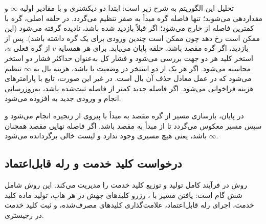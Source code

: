 تحلیل این الگوریتم به شرح زیر است: ابتدا دو دیکشنری  و  با مقادیر اولیه $\infty$ و  مقداردهی می‌شوند؛ تنها فاصله گره مبدأ به صفر تنظیم می‌گردد. در حلقه اصلی، گره با کمترین فاصله از  خارج می‌شود؛ اگر قبلاً بازدید شده باشد، نادیده گرفته می‌شود (این ممکن است رخ دهد چون  ممکن است چندین ورودی برای یک گره داشته باشد). پس از بازدید، اگر گره مقصد باشد، حلقه پایان می‌یابد. برای هر همسایه $v$ از گره فعلی $u$، استخر کلید هر دو جهت بررسی می‌شود و فشار کل به‌عنوان حداکثر فشار دو استخر محاسبه می‌شود. اگر هر یک از دو استخر در وضعیت  یا  باشد، هزینه یال به $\infty$ تنظیم می‌شود که در عمل معادل حذف آن یال است. در غیر این صورت، تابع  با پارامترهای هزینه فراخوانی می‌شود. اگر فاصله جدید کمتر از فاصله ثبت‌شده باشد، به‌روزرسانی انجام و ورودی جدید به  افزوده می‌شود.

در پایان، بازسازی مسیر از گره مقصد به مبدأ با پیروی از زنجیره  انجام می‌شود و سپس مسیر معکوس می‌گردد تا از مبدأ به مقصد باشد. اگر فاصله نهایی مقصد همچنان $\infty$ باشد، یعنی هیچ مسیری وجود ندارد و لیست خالی برگردانده می‌شود.

\subsection{درخواست کلید خدمت و رله قابل‌اعتماد}

روش  در  فرآیند کامل تولید و توزیع کلید خدمت را مدیریت می‌کند. این روش شامل شش گام است: یافتن مسیر با ، رزرو کلیدهای جهش در هر هاپ، تولید ماده کلید خدمت، اجرای رله قابل‌اعتماد، علامت‌گذاری کلیدهای مصرف‌شده، و ثبت کلید خدمت در رجیستری.

